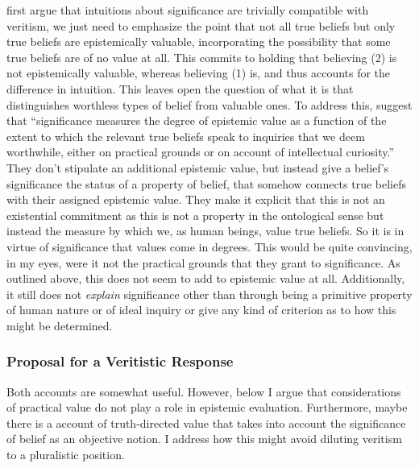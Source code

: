 \documentclass[12pt,numbers=noenddot]{scrartcl}
\begin{document}
\textcite[332]{Ahlstrom-Vij2013} first argue that intuitions about significance are trivially compatible with veritism, we just need to emphasize the point that not all true beliefs but only true beliefs are epistemically valuable, incorporating the possibility that some true beliefs are of no value at all. This commits to holding that believing (2) is not epistemically valuable, whereas believing (1) is, and thus accounts for the difference in intuition. This leaves open the question of what it is that distinguishes worthless types of belief from valuable ones. To address this, \textcite[334]{Ahlstrom-Vij2013} suggest that “significance measures the degree of epistemic value as a function of the extent to which the relevant true beliefs speak to inquiries that we deem worthwhile, either on practical grounds or on account of intellectual curiosity.” They don't stipulate an additional epistemic value, but instead give a belief's significance the status of a property of belief, that somehow connects true beliefs with their assigned epistemic value. They make it explicit that this is not an existential commitment as this is not a property in the ontological sense but instead the measure by which we, as human beings, value true beliefs. So it is in virtue of significance that values come in degrees. This would be quite convincing, in my eyes, were it not the practical grounds that they grant to significance. As outlined above, this does not seem to add to epistemic value at all. Additionally, it still does not \emph{explain} significance other than through being a primitive property of human nature or of ideal inquiry or give any kind of criterion as to how this might be determined.

\subsubsection{Proposal for a Veritistic Response}
Both accounts are somewhat useful. However, below I argue that considerations of practical value do not play a role in epistemic evaluation. Furthermore, maybe there is a account of truth-directed value that takes into account the significance of belief as an objective notion. I address how this might avoid diluting veritism to a pluralistic position.
\end{document}
